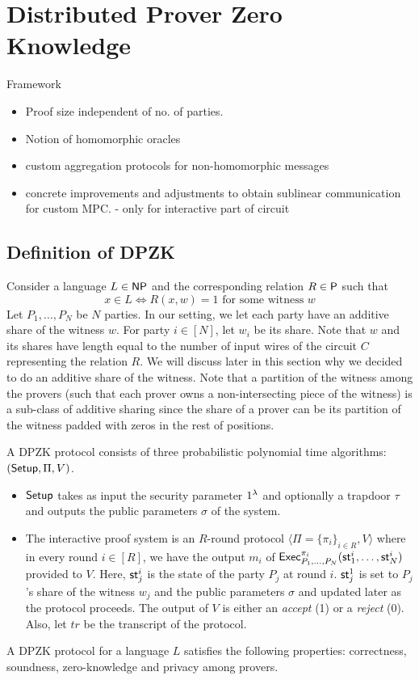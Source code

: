 \section{Distributed Prover Zero Knowledge}
Framework
\begin{itemize}
\item Proof size independent of no. of parties.
\item Notion of homomorphic oracles
\item custom aggregation protocols for non-homomorphic messages
\item concrete improvements and adjustments to obtain sublinear communication for custom MPC. - only for interactive part of circuit
\end{itemize}

\subsection{Definition of DPZK}
Consider a language $L \in \mathsf{NP}$ and the corresponding relation $R \in \mathsf{P}$ such that
\[
x \in L \Leftrightarrow R(x, w)=1 \text{ for some witness } w
\]
Let $P_1, \ldots, P_N$ be $N$ parties. In our setting, we let each party have an additive share of the witness $w$. For party $i \in [N]$, let $w_i$ be its share.  Note that $w$ and its shares have length equal to the number of input wires of the circuit $C$ representing the relation $R$. We will discuss later in this section why we decided to do an additive share of the witness. Note that a partition of the witness among the provers (such that each prover owns a non-intersecting piece of the witness) is a sub-class of additive sharing since the share of a prover can be its partition of the witness padded with zeros in the rest of positions.


A DPZK protocol consists of three probabilistic polynomial time algorithms: $(\mathsf{Setup}, \Pi, V)$. 
\begin{itemize}
\item $\mathsf{Setup}$ takes as input the security parameter $1^{\lambda}$ and optionally a trapdoor $\tau$ and outputs the public parameters $\sigma$ of the system.
\item The interactive proof system is an $R$-round protocol $\langle \Pi = \{\pi_i\}_{i \in R}, V \rangle$ where in every round $i \in [R]$, we have the output $m_i$ of $\mathsf{Exec}^{\pi_i}_{P_1, \ldots, P_N}(\mathsf{st}^i_1, \ldots, \mathsf{st}^i_N)$ provided to $V$. Here, $\mathsf{st}^i_j$ is the state of the party $P_j$ at round $i$. $\mathsf{st}^1_j$ is set to $P_j$'s share of the witness $w_j$ and the public parameters $\sigma$ and updated later as the protocol proceeds. The output of $V$ is either an \textit{accept} (1) or a \textit{reject} (0). Also, let $tr$ be the transcript of the protocol.
\end{itemize}
A DPZK protocol for a language $L$
satisfies the following properties: 
correctness, soundness, zero-knowledge and privacy among provers.
